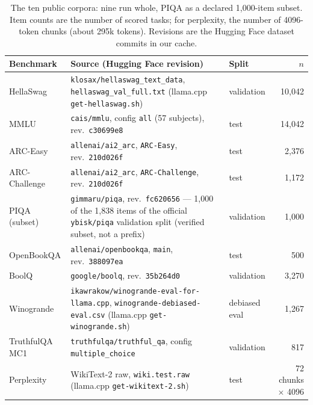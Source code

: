 \documentclass[10pt]{article} %
\begin{document}
\begin{table}[t]
\centering
\small
\begin{tabular}{@{}l >{\raggedright\arraybackslash}p{6.4cm} l r@{}}
\toprule
Benchmark & Source (Hugging Face revision) & Split & $n$ \\
\midrule
HellaSwag & \texttt{klosax/hellaswag\_text\_data}, \texttt{hellaswag\_val\_full.txt} (llama.cpp \texttt{get-hellaswag.sh}) & validation & 10{,}042 \\
MMLU & \texttt{cais/mmlu}, config \texttt{all} (57 subjects), rev.\ \texttt{c30699e8} & test & 14{,}042 \\
ARC-Easy & \texttt{allenai/ai2\_arc}, \texttt{ARC-Easy}, rev.\ \texttt{210d026f} & test & 2{,}376 \\
ARC-Challenge & \texttt{allenai/ai2\_arc}, \texttt{ARC-Challenge}, rev.\ \texttt{210d026f} & test & 1{,}172 \\
PIQA (subset) & \texttt{gimmaru/piqa}, rev.\ \texttt{fc620656} --- 1,000 of the 1,838 items of the official \texttt{ybisk/piqa} validation split (verified subset, not a prefix) & validation & 1{,}000 \\
OpenBookQA & \texttt{allenai/openbookqa}, \texttt{main}, rev.\ \texttt{388097ea} & test & 500 \\
BoolQ & \texttt{google/boolq}, rev.\ \texttt{35b264d0} & validation & 3{,}270 \\
Winogrande & \texttt{ikawrakow/winogrande-eval-for-} \texttt{llama.cpp}, \texttt{winogrande-debiased-eval.csv} (llama.cpp \texttt{get-winogrande.sh}) & debiased eval & 1{,}267 \\
TruthfulQA MC1 & \texttt{truthfulqa/truthful\_qa}, config \texttt{multiple\_choice} & validation & 817 \\
Perplexity & WikiText-2 raw, \texttt{wiki.test.raw} (llama.cpp \texttt{get-wikitext-2.sh}) & test & 72 chunks $\times$ 4096 \\
\bottomrule
\end{tabular}
\caption{The ten public corpora: nine run whole, PIQA as a declared
1,000-item subset. Item counts are the number of
scored tasks; for perplexity, the number of 4096-token chunks (about 295k
tokens). Revisions are the Hugging Face dataset commits in our cache.}
\label{tab:corpora}
\end{table}
\end{document}
